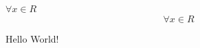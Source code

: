 \documentclass{minimal}
\begin{document}
$\forall x \in R$
\[ 
\forall x \in R
\]

Hello World!
\end{document}
